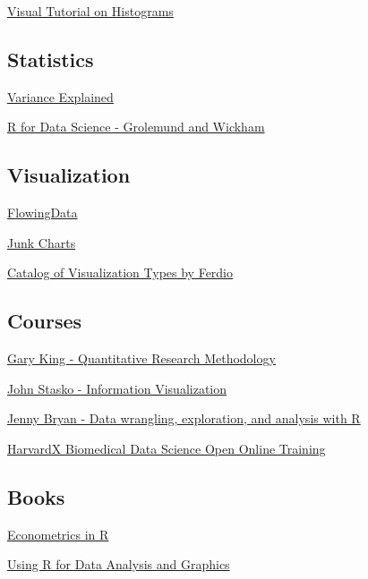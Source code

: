 \documentclass[]{book}
\theoremstyle{definition}
\theoremstyle{definition}
\theoremstyle{remark}
\begin{document}
\href{http://tinlizzie.org/histograms/}{Visual Tutorial on Histograms}

\subsection*{Statistics}\label{statistics}

\href{http://varianceexplained.org/RData/resources/}{Variance Explained}

\href{http://r4ds.had.co.nz/}{R for Data Science - Grolemund and
Wickham}

\subsection*{Visualization}\label{visualization}

\href{http://flowingdata.com/}{FlowingData}

\href{http://junkcharts.typepad.com/}{Junk Charts}

\href{http://datavizproject.com/}{Catalog of Visualization Types by
Ferdio}

\subsection*{Courses}\label{courses}

\href{http://projects.iq.harvard.edu/gov2001/}{Gary King - Quantitative
Research Methodology}

\href{http://www.cc.gatech.edu/~stasko/7450/}{John Stasko - Information
Visualization}

\href{http://stat545.com/}{Jenny Bryan - Data wrangling, exploration,
and analysis with R}

\href{https://rafalab.github.io/pages/harvardx.html}{HarvardX Biomedical
Data Science Open Online Training}

\subsection*{Books}\label{books}

\href{https://cran.r-project.org/doc/contrib/Farnsworth-EconometricsInR.pdf}{Econometrics
in R}

\href{ftp://cran.r-project.org/pub/R/doc/contrib/usingR.pdf}{Using R for
Data Analysis and Graphics}
\end{document}
